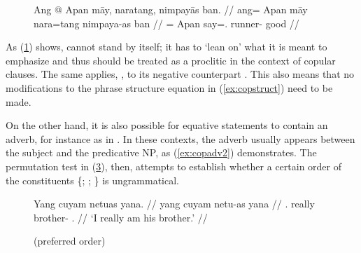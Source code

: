 \begin{figure}[h]
\ex\label{ex:copemphclit}\ljudge*\begingl
	\gla Ang @ Apan māy, naratang, nimpayās ban. //
	\glb ang= Apan māy nara=tang nimpaya-as ban //
	\glc \Aarg{}= Apan \Int{} say=\TplM{}.\Aarg{} runner-\Parg{} good //
\endgl\xe
\end{figure}

As (\ref{ex:copemphclit}) shows,  cannot stand by itself; it
has to `lean on' what it is meant to emphasize and thus should be treated as a
proclitic in the context of copular clauses. The same applies, , to its negative counterpart . This also means that
no modifications to the phrase structure equation in (\ref{ex:copstruct}) need
to be made.

On the other hand, it is also possible for equative statements to contain an
adverb, for instance as in . In these contexts, the
adverb usually appears between the subject and the predicative NP, as
(\ref{ex:copadv2}) demonstrates. The permutation test in (\ref{ex:copadvperm}),
then, attempts to establish whether a certain order of the constituents 
\{; ; \} is ungrammatical.

\begin{figure}
\pex\label{ex:copadv2}
\a\label{ex:copadv2_1}\begingl
	\gla Yang cuyam netuas yana. //
	\glb yang cuyam netu-as yana //
	\glc \Fsg{}.\Aarg{} really brother-\Parg{} \TsgM{}.\Gen{} //
	\glft `I really am his brother.' //
\endgl

\a\label{ex:copadv2_2}%

\a\label{ex:copadv2_3}\ljudge*%

\xe
\end{figure}

\begin{figure}
\pex\label{ex:copadvperm}
\a{} (preferred order)
\a{}
\a{}
\a{}
\a{}
\a{}
\xe
\end{figure}

